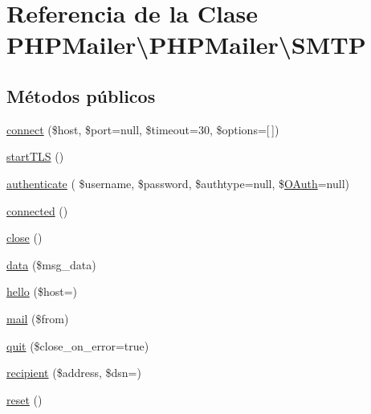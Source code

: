 \hypertarget{classPHPMailer_1_1PHPMailer_1_1SMTP}{}\section{Referencia de la Clase P\+H\+P\+Mailer\textbackslash{}P\+H\+P\+Mailer\textbackslash{}S\+M\+TP}
\label{classPHPMailer_1_1PHPMailer_1_1SMTP}
\subsection*{Métodos públicos}
\begin{DoxyCompactItemize}
\item 
\hyperlink{classPHPMailer_1_1PHPMailer_1_1SMTP_a67c7eef2c32d3ef26b6eb28afca3820b}{connect} (\$host, \$port=null, \$timeout=30, \$options=\mbox{[}$\,$\mbox{]})
\item 
\hyperlink{classPHPMailer_1_1PHPMailer_1_1SMTP_aaa8c1051e8ca80b381bf5667558074de}{start\+T\+LS} ()
\item 
\hyperlink{classPHPMailer_1_1PHPMailer_1_1SMTP_a70ebff41266b8b64c44ea535f1afb8cd}{authenticate} ( \$username, \$password, \$authtype=null, \$\hyperlink{classPHPMailer_1_1PHPMailer_1_1OAuth}{O\+Auth}=null)
\item 
\hyperlink{classPHPMailer_1_1PHPMailer_1_1SMTP_ad61de5eca48890f8d121a3b9c9df2824}{connected} ()
\item 
\hyperlink{classPHPMailer_1_1PHPMailer_1_1SMTP_aff2f3ac922cccee840cf0965bdfb92e0}{close} ()
\item 
\hyperlink{classPHPMailer_1_1PHPMailer_1_1SMTP_a521b8dadc893ac68f1a3b27e54f7faaa}{data} (\$msg\+\_\+data)
\item 
\hyperlink{classPHPMailer_1_1PHPMailer_1_1SMTP_a7c2586a9df8e7f638c29ba6c52a39008}{hello} (\$host=\textquotesingle{}\textquotesingle{})
\item 
\hyperlink{classPHPMailer_1_1PHPMailer_1_1SMTP_a7852892b4a5408f381d100a4715e4bab}{mail} (\$from)
\item 
\hyperlink{classPHPMailer_1_1PHPMailer_1_1SMTP_a24fcba4fe3670779926dc7d890afb3e6}{quit} (\$close\+\_\+on\+\_\+error=true)
\item 
\hyperlink{classPHPMailer_1_1PHPMailer_1_1SMTP_a3fe758d41853a59d4ccfdce815f006a2}{recipient} (\$address, \$dsn=\textquotesingle{}\textquotesingle{})
\item 
\hyperlink{classPHPMailer_1_1PHPMailer_1_1SMTP_ace903ddfc53a6c998f694cf894266fa4}{reset} ()

\end{DoxyCompactItemize}
